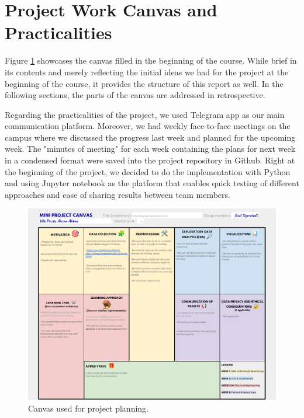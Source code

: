 \documentclass{article}
\numberwithin{equation}{section}
\begin{document}
\clearpage
\section{Project Work Canvas and Practicalities}
Figure \ref{fig1} showcases the canvas filled in the beginning of the course. While brief in its contents and merely reflecting the initial ideas we had for the project at the beginning of the course, it provides the structure of this report as well. In the following sections, the parts of the canvas are addressed in retrospective.

Regarding the practicalities of the project, we used Telegram app as our main communication platform. Moreover, we had weekly face-to-face meetings on the campus where we discussed the progress last week and planned for the upcoming week. The "minutes of meeting" for each week containing the plans for next week in a condensed format were saved into the project repository in Github. Right at the beginning of the project, we decided to do the implementation with Python and using Jupyter notebook as the platform that enables quick testing of different approaches and ease of sharing results between team members.



\begin{figure}[htb]
	\centering
	\includegraphics[width=1\textwidth]{./mini_project_canvas.pdf}
	\caption{Canvas used for project planning.}
	\label{fig1}
\end{figure}

\clearpage
\end{document}
